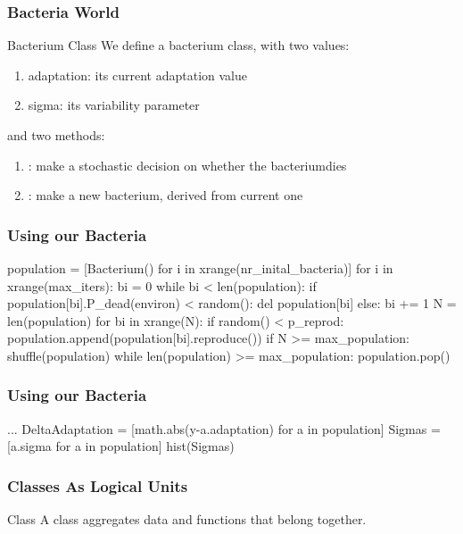 \begin{frame}[fragile] 
\frametitle{Bacteria World}
\begin{block}{Bacterium Class}
We define a bacterium class, with two values:
\begin{enumerate}
\item adaptation: its current adaptation value
\item sigma: its variability parameter
\end{enumerate}
and two methods:
\begin{enumerate}
\item {}: make a stochastic decision on whether the bacteriumdies
\item {}: make a new bacterium, derived from current one
\end{enumerate}
\end{block}

\end{frame}

\begin{frame}[fragile] 
\frametitle{Using our Bacteria}
\begin{python}
population = [Bacterium()
        for i in xrange(nr_inital_bacteria)]
for i in xrange(max_iters):
    bi = 0
    while bi < len(population):
        if population[bi].P_dead(environ) < random():
            del population[bi]
        else:
            bi += 1
    N = len(population)
    for bi in xrange(N):
        if random() < p_reprod:
            population.append(population[bi].reproduce())
    if N >= max_population:
        shuffle(population)
        while len(population) >= max_population:
            population.pop()
\end{python}
\end{frame}

\begin{frame}[fragile] 
\frametitle{Using our Bacteria}

\begin{python}
...
DeltaAdaptation = [math.abs(y-a.adaptation) 
                    for a in population]
Sigmas = [a.sigma for a in population]
hist(Sigmas)
\end{python}

\end{frame}

\begin{frame}[fragile] 
\frametitle{Classes As Logical Units}
\begin{block}{Class}
A class aggregates data and functions that belong together.
\end{block}
\end{frame}


